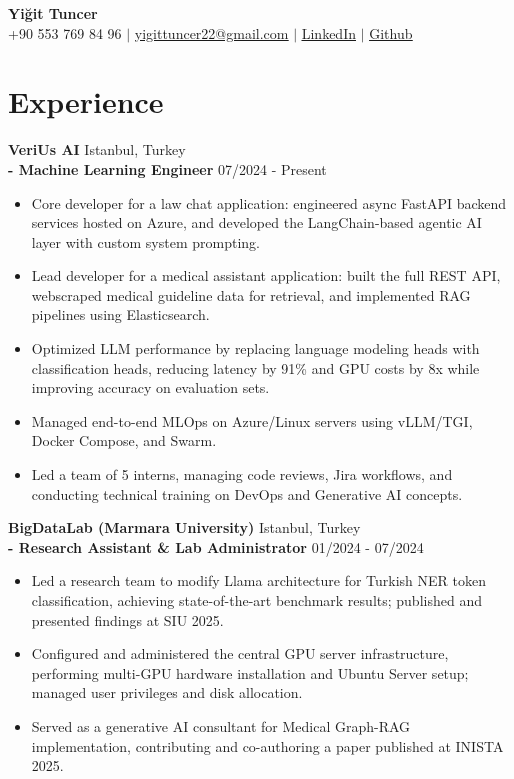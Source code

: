\documentclass[paper=a4,fontsize=10pt]{scrartcl}
\begin{document}
\begin{center}
    \textbf{\Huge Yiğit Tuncer} \\ \vspace{2pt}
    +90 553 769 84 96 $|$ \href{mailto:yigittuncer22@gmail.com}{\underline{yigittuncer22@gmail.com}} $|$
    \href{https://www.linkedin.com/in/yigittuncer03/}{\underline{LinkedIn}} $|$
    \href{https://github.com/yigittuncer07}{\underline{Github}} 
\end{center}
\vspace{-10pt}

\section*{Experience}
\textbf{VeriUs AI} \hfill Istanbul, Turkey\\
\textbf{- Machine Learning Engineer} \hfill 07/2024 - Present
\begin{itemize}[noitemsep, topsep=2pt, parsep=0pt, partopsep=0pt, leftmargin=*]
    \item Core developer for a law chat application: engineered async FastAPI backend services hosted on Azure, and developed the LangChain-based agentic AI layer with custom system prompting.
    \item Lead developer for a medical assistant application: built the full REST API, webscraped medical guideline data for retrieval, and implemented RAG pipelines using Elasticsearch.
    \item Optimized LLM performance by replacing language modeling heads with classification heads, reducing latency by 91\% and GPU costs by 8x while improving accuracy on evaluation sets.
    \item Managed end-to-end MLOps on Azure/Linux servers using vLLM/TGI, Docker Compose, and Swarm.
    \item Led a team of 5 interns, managing code reviews, Jira workflows, and conducting technical training on DevOps and Generative AI concepts.
\end{itemize}

\textbf{BigDataLab (Marmara University)} \hfill Istanbul, Turkey\\
\textbf{- Research Assistant \& Lab Administrator} \hfill 01/2024 - 07/2024
\begin{itemize}[noitemsep, topsep=2pt, parsep=0pt, partopsep=0pt, leftmargin=*]
    \item Led a research team to modify Llama architecture for Turkish NER token classification, achieving state-of-the-art benchmark results; published and presented findings at SIU 2025.
    \item Configured and administered the central GPU server infrastructure, performing multi-GPU hardware installation and Ubuntu Server setup; managed user privileges and disk allocation.
    \item Served as a generative AI consultant for Medical Graph-RAG implementation, contributing and co-authoring a paper published at INISTA 2025.
\end{itemize}
\end{document}
